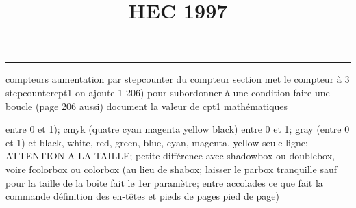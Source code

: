 \documentclass[11pt]{article}%
\title{\bf \vspace{-1cm} HEC 1997} %
\author{} %
\date{} %
\renewcommand{\headrulewidth}{0pt}%
\renewcommand{\footrulewidth}{0.4pt}%
\begin{document}
\maketitle %
\vspace{-1.2cm}\hrule %
\thispagestyle{fancy}

\vspace*{.4cm}


compteurs%
aumentation par stepcounter du compteur section%
met le compteur à 3%
stepcounter{cpt1} on ajoute 1%
206) pour subordonner à une condition %
faire une boucle (page 206 aussi) %
document la valeur de cpt1 
mathématiques\newcommand{\ch}{\operatorname{ch}} 
\newcommand{\sh}{\operatorname{sh}}
\renewcommand{\tanh}{\operatorname{th}}
\renewcommand{\sinh}{\operatorname{sh}}
\renewcommand{\cosh}{\operatorname{ch}}
\newcommand{\argsh}{\operatorname{argsh}}
\newcommand{\argch}{\operatorname{argch}}
\newcommand{\argth}{\operatorname{argth}}
\newcommand{\Id}{\operatorname{Id}}
\renewcommand{\leq}{\leq}
\renewcommand{\geq}{\geq }

\newcommand{\dlim}{\lim}
\newcommand{\dsum}{\sum}
\newcommand{\dprod}{\prod}



entre 0 et 1); cmyk (quatre cyan magenta yellow black) entre 0 et 1;
gray (entre 0 et 1) et black, white, red, green, blue, cyan, magenta,
yellow%
seule ligne; ATTENTION A LA TAILLE; petite différence avec shadowbox ou
doublebox, voire fcolorbox ou colorbox (au lieu de shabox; laisser le
parbox tranquille sauf pour la taille de la boîte
\newcommand{\Tbox}[1]{\begin{center} \shabox{\parbox{0.6
\linewidth}{#1}} \end{center}} %
fait le 1er paramètre; entre accolades ce que fait la commande
définition des en-têtes et pieds de pages\pagestyle{fancy}
\chead{}
\rfoot[ \ \thepage]{\thepage}
\cfoot{}
\lfoot{}
\thispagestyle{fancy} %
pied de page)\renewcommand{\footrulewidth}{0.4pt}
\renewcommand{\headrulewidth}{0.4pt}
\end{document}
